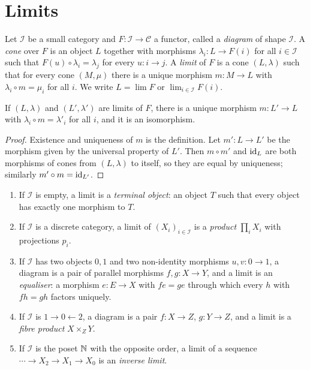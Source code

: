 \section{Limits}\label{categories:section-limits}

\begin{definition}\label{categories:definition-limit}
Let $\mathcal{I}$ be a small category and $F \colon \mathcal{I} \to \mathcal{C}$ a
functor, called a \emph{diagram} of shape $\mathcal{I}$. A \emph{cone} over $F$ is
an object $L$ together with morphisms $\lambda_i \colon L \to F(i)$ for all
$i \in \mathcal{I}$ such that $F(u) \circ \lambda_i = \lambda_j$ for every
$u \colon i \to j$. A \emph{limit} of $F$ is a cone $(L, \lambda)$ such that for
every cone $(M, \mu)$ there is a unique morphism $m \colon M \to L$ with
$\lambda_i \circ m = \mu_i$ for all $i$. We write $L = \lim F$ or
$\lim_{i \in \mathcal{I}} F(i)$.
\end{definition}

\begin{lemma}\label{categories:lemma-limit-unique}
If $(L, \lambda)$ and $(L', \lambda')$ are limits of $F$, there is a unique
morphism $m \colon L' \to L$ with $\lambda_i \circ m = \lambda'_i$ for all $i$, and it
is an isomorphism.
\end{lemma}

\begin{proof}
Existence and uniqueness of $m$ is the definition. Let $m' \colon L \to L'$ be the
morphism given by the universal property of $L'$. Then $m \circ m'$ and $\mathrm{id}_L$
are both morphisms of cones from $(L, \lambda)$ to itself, so they are equal by
uniqueness; similarly $m' \circ m = \mathrm{id}_{L'}$.
\end{proof}

\begin{example}\label{categories:example-limits}
\begin{enumerate}
\item If $\mathcal{I}$ is empty, a limit is a \emph{terminal object}: an object
$T$ such that every object has exactly one morphism to $T$.
\item If $\mathcal{I}$ is a discrete category, a limit of $(X_i)_{i \in \mathcal{I}}$ is a
\emph{product} $\prod_i X_i$ with projections $p_i$.
\item If $\mathcal{I}$ has two objects $0, 1$ and two non-identity morphisms
$u, v \colon 0 \to 1$, a diagram is a pair of parallel morphisms
$f, g \colon X \to Y$, and a limit is an \emph{equaliser}: a morphism
$e \colon E \to X$ with $fe = ge$ through which every $h$ with $fh = gh$ factors
uniquely.
\item If $\mathcal{I}$ is $1 \to 0 \leftarrow 2$, a diagram is a pair
$f \colon X \to Z$, $g \colon Y \to Z$, and a limit is a \emph{fibre product}
$X \times_Z Y$.
\item If $\mathcal{I}$ is the poset $\mathbb{N}$ with the opposite order, a limit of a
sequence $\cdots \to X_2 \to X_1 \to X_0$ is an \emph{inverse limit}.
\end{enumerate}
\end{example}

